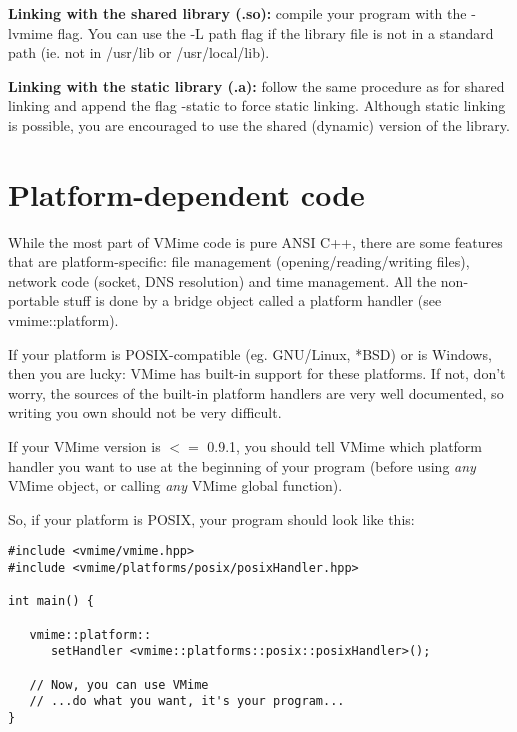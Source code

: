 {\bf Linking with the shared library (.so):} compile your program with the
{\vcode -lvmime} flag. You can use the -L path flag if the library file is
not in a standard path (ie. not in /usr/lib or /usr/local/lib).


{\bf Linking with the static library (.a):} follow the same procedure as for
shared linking and append the flag -static to force static linking. Although
static linking is possible, you are encouraged to use the shared (dynamic)
version of the library.


\section{Platform-dependent code}

While the most part of VMime code is pure ANSI C++, there are some features
that are platform-specific: file management (opening/reading/writing files),
network code (socket, DNS resolution) and time management. All the
non-portable stuff is done by a bridge object called a platform handler (see
{\vcode vmime::platform}).

If your platform is POSIX-compatible (eg. GNU/Linux, *BSD) or is Windows,
then you are lucky: VMime has built-in support for these platforms. If not,
don't worry, the sources of the built-in platform handlers are very well
documented, so writing you own should not be very difficult.

If your VMime version is $<=$ 0.9.1, you should tell VMime which platform
handler you want to use at the beginning of your program (before using
\emph{any} VMime object, or calling \emph{any} VMime global function).

So, if your platform is POSIX, your program should look like this:

\begin{lstlisting}[caption={Initializing VMime and the platform handler}]
#include <vmime/vmime.hpp>
#include <vmime/platforms/posix/posixHandler.hpp>

int main() {

   vmime::platform::
      setHandler <vmime::platforms::posix::posixHandler>();

   // Now, you can use VMime
   // ...do what you want, it's your program...
}
\end{lstlisting}

